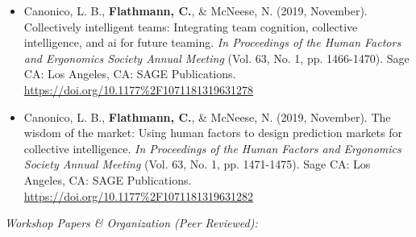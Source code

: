 \begin{itemize}[align=left, labelwidth=3em,]
\item[C.2] Canonico, L. B., \textbf{Flathmann, C.}, \& McNeese, N. (2019, November). Collectively intelligent teams: Integrating team cognition, collective intelligence, and ai for future teaming. \textit{In Proceedings of the Human Factors and Ergonomics Society Annual Meeting} (Vol. 63, No. 1, pp. 1466-1470). Sage CA: Los Angeles, CA: SAGE Publications. \url{https://doi.org/10.1177\%2F1071181319631278} \\

\item[C.1] Canonico, L. B., \textbf{Flathmann, C.}, \& McNeese, N. (2019, November). The wisdom of the market: Using human factors to design prediction markets for collective intelligence. \textit{In Proceedings of the Human Factors and Ergonomics Society Annual Meeting} (Vol. 63, No. 1, pp. 1471-1475). Sage CA: Los Angeles, CA: SAGE Publications. \url{https://doi.org/10.1177\%2F1071181319631282} \\

\end{itemize}

\bigskip \noindent
\textit{Workshop Papers \& Organization (Peer Reviewed):}
\bigskip \noindent

